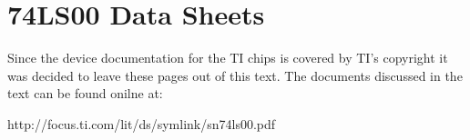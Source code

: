 \chapter{74LS00 Data Sheets}

\label{page:74ls00}
Since the device documentation for the TI chips is
covered by TI's copyright it was decided to leave 
these pages out of this text.  The documents discussed
in the text can be found onilne at:

http://focus.ti.com/lit/ds/symlink/sn74ls00.pdf
